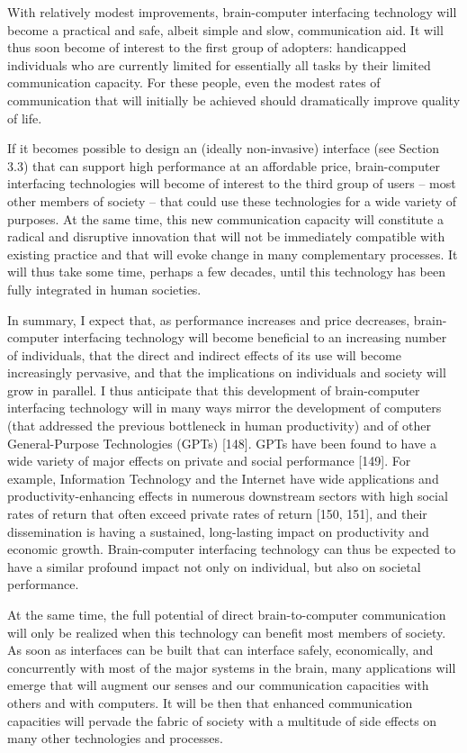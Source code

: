 \documentclass[fleqn,11pt]{olplainarticle}
\begin{document}
With relatively modest improvements, brain-computer interfacing technology will become a practical and safe, albeit simple and slow, communication aid. It will thus soon become of interest to the first group of adopters: handicapped individuals who are currently limited for essentially all tasks by their limited communication capacity. For these people, even the modest rates of communication that will initially be achieved should dramatically improve quality of life.\cite{schalk2008brain}

If it becomes possible to design an (ideally non-invasive) interface (see Section 3.3) that can support high performance at an affordable price, brain-computer interfacing technologies will become of interest to the third group of users – most other members of society – that could use these technologies for a wide variety of purposes. At the same time, this new communication capacity will constitute a radical and disruptive innovation that will not be immediately compatible with existing practice and that will evoke change in many complementary processes. It will thus take some time, perhaps a few decades, until this technology has been fully integrated in human societies.

In summary, I expect that, as performance increases and price decreases, brain- computer interfacing technology will become beneficial to an increasing number of individuals, that the direct and indirect effects of its use will become increasingly pervasive, and that the implications on individuals and society will grow in parallel. I thus anticipate that this development of brain-computer interfacing technology will in many ways mirror the development of computers (that addressed the previous bottleneck in human productivity) and of other General-Purpose Technologies (GPTs) [148]. GPTs have been found to have a wide variety of major effects on private and social performance [149]. For example, Information Technology and the Internet have wide applications and productivity-enhancing effects in numerous downstream sectors with high social rates of return that often exceed private rates of return [150, 151], and their dissemination is having a sustained, long-lasting impact on productivity and economic growth. Brain-computer interfacing technology can thus be expected to have a similar profound impact not only on individual, but also on societal performance.
\cite{schalk2008brain}

At the same time, the full potential of direct brain-to-computer communication will only be realized when this technology can benefit most members of society. As soon as interfaces can be built that can interface safely, economically, and concurrently with most of the major systems in the brain, many applications will emerge that will augment our senses and our communication capacities with others and with computers. It will be then that enhanced communication capacities will pervade the fabric of society with a multitude of side effects on many other technologies and processes.\cite{schalk2008brain}
\end{document}
